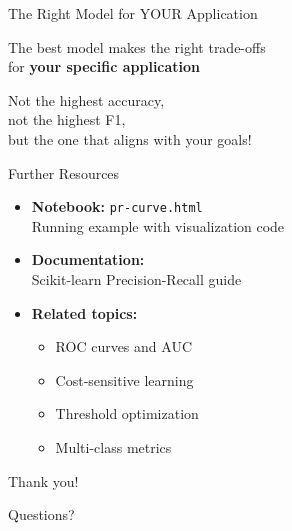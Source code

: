 \documentclass{beamer}
\begin{document}
\begin{frame}{The Right Model for YOUR Application}
\begin{center}
\Large
The best model makes the right trade-offs \\
for \textbf{your specific application}

\vspace{0.2cm}

Not the highest accuracy, \\
not the highest F1, \\
but the one that aligns with your goals!
\end{center}
\end{frame}

\begin{frame}{Further Resources}
\begin{itemize}
    \item \textbf{Notebook:} \texttt{pr-curve.html} \\
          Running example with visualization code

    \item \textbf{Documentation:} \\
          Scikit-learn Precision-Recall guide

    \item \textbf{Related topics:}
    \begin{itemize}
        \item ROC curves and AUC
        \item Cost-sensitive learning
        \item Threshold optimization
        \item Multi-class metrics
    \end{itemize}
\end{itemize}
\end{frame}

\begin{frame}
\begin{center}
\Huge
Thank you!

\vspace{1cm}

\Large
Questions?
\end{center}
\end{frame}
\end{document}
